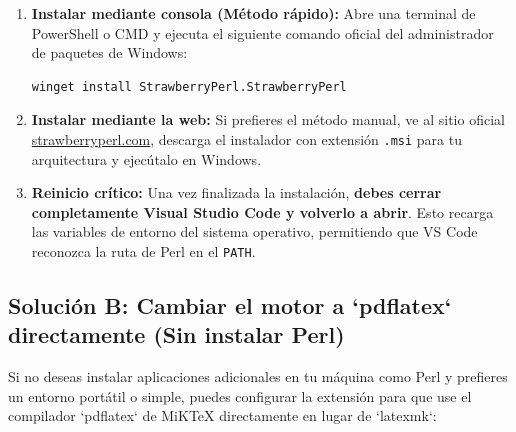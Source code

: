 \documentclass[
10pt, %
a4paper, %
oneside, %
headinclude,footinclude, %
BCOR5mm, %
]{scrartcl}
\begin{document}
\begin{enumerate}
	\item \textbf{Instalar mediante consola (Método rápido):} Abre una terminal de PowerShell o CMD y ejecuta el siguiente comando oficial del administrador de paquetes de Windows:
	\begin{lstlisting}[language=DOS]
	winget install StrawberryPerl.StrawberryPerl
	\end{lstlisting}
	\item \textbf{Instalar mediante la web:} Si prefieres el método manual, ve al sitio oficial \href{https://strawberryperl.com/}{strawberryperl.com}, descarga el instalador con extensión \texttt{.msi} para tu arquitectura y ejecútalo en Windows.
	\item \textbf{Reinicio crítico:} Una vez finalizada la instalación, \textbf{debes cerrar completamente Visual Studio Code y volverlo a abrir}. Esto recarga las variables de entorno del sistema operativo, permitiendo que VS Code reconozca la ruta de Perl en el \texttt{PATH}.
\end{enumerate}

\subsection{Solución B: Cambiar el motor a `pdflatex` directamente (Sin instalar Perl)}
Si no deseas instalar aplicaciones adicionales en tu máquina como Perl y prefieres un entorno portátil o simple, puedes configurar la extensión para que use el compilador `pdflatex` de MiKTeX directamente en lugar de `latexmk`:
\end{document}
